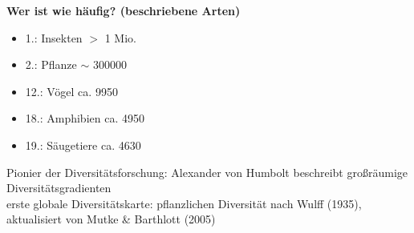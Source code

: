 \newpage
\textbf{Wer ist wie häufig? (beschriebene Arten)}
\begin{itemize}
	\item 1.: Insekten $>$ 1 Mio.
	\item 2.: Pflanze $\sim$ 300000
	\item 12.: Vögel ca. 9950
	\item 18.: Amphibien ca. 4950
	\item 19.: Säugetiere ca. 4630
\end{itemize}

Pionier der Diversitätsforschung: Alexander von Humbolt beschreibt großräumige Diversitätsgradienten\\

erste globale Diversitätskarte: pflanzlichen Diversität nach Wulff (1935), aktualisiert von Mutke \& Barthlott (2005)